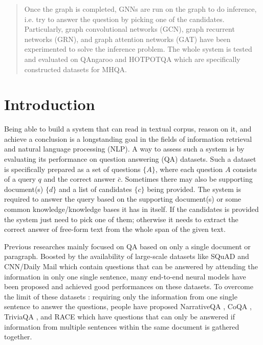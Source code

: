 \documentclass{report}
\begin{document}
\begin{abstract}
\begin{singlespace}

Once the graph is completed, GNNs are run on the graph to do inference, i.e. try to answer the question by picking one of the candidates. Particularly, graph convolutional networks (GCN), graph recurrent networks (GRN), and graph attention networks (GAT) have been experimented to solve the inference problem. The whole system is tested and evaluated on QAngaroo and HOTPOTQA which are specifically constructed datasets for MHQA.

\end{singlespace}
\end{abstract}
\tableofcontents
\listoffigures


\chapter{Introduction}
Being able to build a system that can read in textual corpus, reason on it, and achieve a conclusion is a longstanding goal in the fields of information retrieval and natural language processing (NLP). A way to assess such a system is by evaluating its performance on question answering (QA) datasets. Such a dataset is specifically prepared as a set of questions $\{A\}$, where each question $A$ consists of a query $q$ and the correct answer $\bar{c}$. Sometimes there may also be supporting document(s) $\{d\}$ and a list of candidates $\{c\}$ being provided. The system is required to answer the query based on the supporting document(s) or some common knowledge/knowledge bases it has in itself. If the candidates is provided the system just need to pick one of them; otherwise it needs to extract the correct answer of free-form text from the whole span of the given text.

Previous researches mainly focused on QA based on only a single document or paragraph. Boosted by the availability of large-scale datasets like SQuAD \cite{rajpurkar_squad:_2016} and CNN/Daily Mail \cite{hermann_teaching_2015} which contain questions that can be answered by attending the information in only one single sentence,  many end-to-end neural models \cite{seo_bidirectional_2016, xiong_dynamic_2016, shen_reasonet:_2017} have been proposed and achieved good performances on these datasets. To overcome the limit of these datasets \cite{weissenborn_making_2017}: requiring only the information from one single sentence to answer the questions, people have proposed NarrativeQA \cite{kocisky_narrativeqa_2018}, CoQA \cite{reddy_coqa:_2019}, TriviaQA \cite{joshi_triviaqa:_2017}, and RACE \cite{lai_race:_2017} which have questions that can only be answered if information from multiple sentences within the same document is gathered together.
\end{document}
